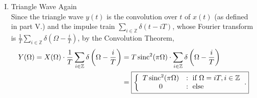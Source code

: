 \documentclass[11pt]{article}
\newcommand{\Z}{\mathbb{Z}} %
\newcommand{\sinc}{\operatorname{sinc}}
\begin{document}
\begin{enumerate}[I.]
\item Triangle Wave Again \\
Since the triangle wave $y(t)$ is the convolution over $t$ of $x(t)$ (as
defined in part V.) and the impulse train
$\sum_{i \in \Z} \delta\left( t - iT \right)$, whose Fourier transform is
$\frac1T\sum_{i \in \Z} \delta\left( \Omega - \frac{i}{T} \right)$, by the
Convolution Theorem,
\begin{align*}
Y(\Omega)
   = X(\Omega)
        \cdot \frac1T\sum_{i \in \Z} \delta\left( \Omega - \frac{i}{T} \right)
 & = T\sinc^2(\pi\Omega)
        \cdot \sum_{i \in \Z} \delta\left( \Omega - \frac{i}{T} \right) \\
 & = \mbox{\fbox{$\displaystyle
      \left\{
          \begin{array}{cl}
              T\sinc^2(\pi\Omega)   & : \mbox{ if $\Omega = iT, i \in \Z$} \\
              0                     & : \mbox{ else}
          \end{array}
      \right.$.}}
\end{align*}
\end{enumerate}
\end{document}
